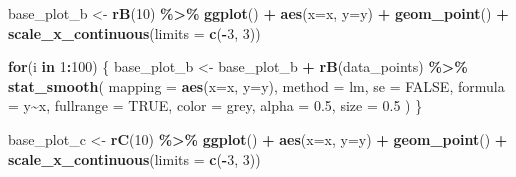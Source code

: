 \documentclass[
]{book}
\newenvironment{Shaded}{\begin{snugshade}}{\end{snugshade}}
\newcommand{\AttributeTok}[1]{\textcolor[rgb]{0.13,0.29,0.53}{#1}}
\newcommand{\ConstantTok}[1]{\textcolor[rgb]{0.56,0.35,0.01}{#1}}
\newcommand{\ControlFlowTok}[1]{\textcolor[rgb]{0.13,0.29,0.53}{\textbf{#1}}}
\newcommand{\DecValTok}[1]{\textcolor[rgb]{0.00,0.00,0.81}{#1}}
\newcommand{\FloatTok}[1]{\textcolor[rgb]{0.00,0.00,0.81}{#1}}
\newcommand{\FunctionTok}[1]{\textcolor[rgb]{0.13,0.29,0.53}{\textbf{#1}}}
\newcommand{\NormalTok}[1]{#1}
\newcommand{\OtherTok}[1]{\textcolor[rgb]{0.56,0.35,0.01}{#1}}
\newcommand{\SpecialCharTok}[1]{\textcolor[rgb]{0.81,0.36,0.00}{\textbf{#1}}}
\newcommand{\StringTok}[1]{\textcolor[rgb]{0.31,0.60,0.02}{#1}}
\theoremstyle{definition}
\theoremstyle{definition}
\theoremstyle{definition}
\theoremstyle{definition}
\theoremstyle{remark}
\begin{document}
\begin{Shaded}
\begin{Highlighting}[]
\NormalTok{base\_plot\_b }\OtherTok{\textless{}{-}} \FunctionTok{rB}\NormalTok{(}\DecValTok{10}\NormalTok{) }\SpecialCharTok{\%\textgreater{}\%}  
  \FunctionTok{ggplot}\NormalTok{() }\SpecialCharTok{+} 
  \FunctionTok{aes}\NormalTok{(}\AttributeTok{x=}\NormalTok{x, }\AttributeTok{y=}\NormalTok{y) }\SpecialCharTok{+} 
  \FunctionTok{geom\_point}\NormalTok{() }\SpecialCharTok{+} 
  \FunctionTok{scale\_x\_continuous}\NormalTok{(}\AttributeTok{limits =} \FunctionTok{c}\NormalTok{(}\SpecialCharTok{{-}}\DecValTok{3}\NormalTok{, }\DecValTok{3}\NormalTok{))}

\ControlFlowTok{for}\NormalTok{(i }\ControlFlowTok{in} \DecValTok{1}\SpecialCharTok{:}\DecValTok{100}\NormalTok{) \{ }
\NormalTok{    base\_plot\_b }\OtherTok{\textless{}{-}}\NormalTok{ base\_plot\_b }\SpecialCharTok{+} \FunctionTok{rB}\NormalTok{(data\_points) }\SpecialCharTok{\%\textgreater{}\%} 
      \FunctionTok{stat\_smooth}\NormalTok{(}
        \AttributeTok{mapping =} \FunctionTok{aes}\NormalTok{(}\AttributeTok{x=}\NormalTok{x, }\AttributeTok{y=}\NormalTok{y), }
        \AttributeTok{method  =} \StringTok{\textquotesingle{}lm\textquotesingle{}}\NormalTok{,         }\AttributeTok{se =} \ConstantTok{FALSE}\NormalTok{, }
        \AttributeTok{formula =} \StringTok{\textquotesingle{}y\textasciitilde{}x\textquotesingle{}}\NormalTok{, }\AttributeTok{fullrange =} \ConstantTok{TRUE}\NormalTok{,}
        \AttributeTok{color   =} \StringTok{\textquotesingle{}grey\textquotesingle{}}\NormalTok{,    }\AttributeTok{alpha =} \FloatTok{0.5}\NormalTok{,}
        \AttributeTok{size    =} \FloatTok{0.5}
\NormalTok{      )}
\NormalTok{  \}}

\NormalTok{base\_plot\_c }\OtherTok{\textless{}{-}} \FunctionTok{rC}\NormalTok{(}\DecValTok{10}\NormalTok{) }\SpecialCharTok{\%\textgreater{}\%}  
  \FunctionTok{ggplot}\NormalTok{() }\SpecialCharTok{+} 
  \FunctionTok{aes}\NormalTok{(}\AttributeTok{x=}\NormalTok{x, }\AttributeTok{y=}\NormalTok{y) }\SpecialCharTok{+} 
  \FunctionTok{geom\_point}\NormalTok{() }\SpecialCharTok{+} 
  \FunctionTok{scale\_x\_continuous}\NormalTok{(}\AttributeTok{limits =} \FunctionTok{c}\NormalTok{(}\SpecialCharTok{{-}}\DecValTok{3}\NormalTok{, }\DecValTok{3}\NormalTok{))}


\end{Highlighting}
\end{Shaded}
\end{document}
